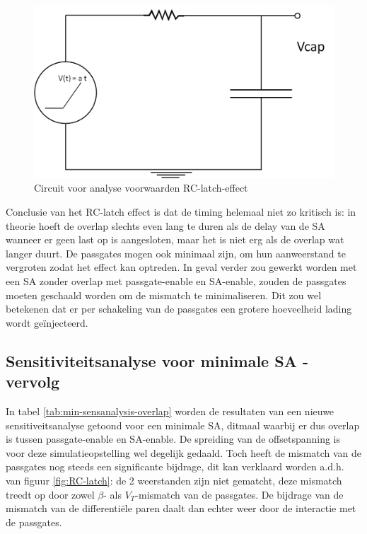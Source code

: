 \begin{figure}
  \centering
  \includegraphics[scale=0.4]{../fig/hfdstk-sensamp-RC-latch-maplecircuit.png}
  \caption[Circuit voor analyse voorwaarden RC-latch-effect]{Circuit voor analyse voorwaarden RC-latch-effect}
  \label{fig:RC-latch-maplecircuit}
\end{figure}

Conclusie van het RC-latch effect is dat de timing helemaal niet zo kritisch is: in theorie hoeft de overlap slechts even lang te duren als de delay van de SA wanneer er geen last op is aangesloten, maar het is niet erg als de overlap wat langer duurt.
De passgates mogen ook minimaal zijn, om hun aanweerstand te vergroten zodat het effect kan optreden.
In geval verder zou gewerkt worden met een SA zonder overlap met passgate-enable en SA-enable, zouden de passgates moeten geschaald worden om de mismatch te minimaliseren. Dit zou wel betekenen dat er per schakeling van de passgates een grotere hoeveelheid lading wordt geïnjecteerd.


\subsection{Sensitiviteitsanalyse voor minimale SA - vervolg}

In tabel \ref{tab:min-sensanalysis-overlap} worden de resultaten van een nieuwe sensitiveitsanalyse getoond voor een minimale SA, ditmaal waarbij er dus overlap is tussen passgate-enable en SA-enable. De spreiding van de offsetspanning is voor deze simulatieopstelling wel degelijk gedaald. Toch heeft de mismatch van de passgates nog steeds een significante bijdrage, dit kan verklaard worden a.d.h. van figuur \ref{fig:RC-latch}: de 2 weerstanden zijn niet gematcht, deze mismatch treedt op door zowel $\beta$- als $V_{T}$-mismatch van de passgates. De bijdrage van de mismatch van de differentiële paren daalt dan echter weer door de interactie met de passgates.

